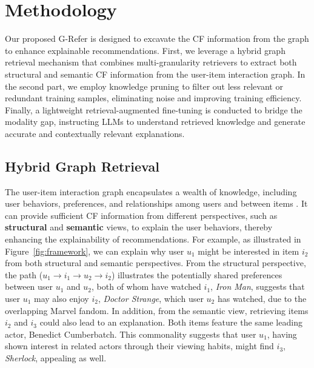 \section{Methodology}

Our proposed G-Refer is designed to excavate the CF information from the graph to enhance explainable recommendations. 
First, we leverage a hybrid graph retrieval mechanism that combines multi-granularity retrievers to extract both structural and semantic CF information from the user-item interaction graph. In the second part, we employ knowledge pruning to filter out less relevant or redundant training samples, eliminating noise and improving training efficiency. Finally, a lightweight retrieval-augmented fine-tuning is conducted to bridge the modality gap, instructing LLMs to understand retrieved knowledge and generate accurate and contextually relevant explanations.

\subsection{Hybrid Graph Retrieval}


The user-item interaction graph encapsulates a wealth of knowledge, including user behaviors, preferences, and relationships among users and between items \cite{wu2024survey}. It can provide sufficient CF information from different perspectives, such as \textbf{structural} and \textbf{semantic} views, to explain the user behaviors, thereby enhancing the explainability of recommendations. 
For example, as illustrated in Figure~\ref{fig:framework}, we can explain why user $u_1$ might be interested in item $i_2$ from both structural and semantic perspectives. 
From the structural perspective, the path ($u_1 \rightarrow i_1 \rightarrow u_2 \rightarrow i_2$) illustrates the potentially shared preferences between user $u_1$ and $u_2$, both of whom have watched $i_1$, \textit{Iron Man}, suggests that user $u_1$ may also enjoy  $i_2$, \textit{Doctor Strange},  which user $u_2$ has watched, due to the overlapping Marvel fandom.
In addition, from the semantic view, retrieving items $i_2$ and $i_3$ could also lead to an explanation. Both items feature the same leading actor, Benedict Cumberbatch. This commonality suggests that user $u_1$, having shown interest in related actors through their viewing habits, might find $i_3$, \textit{Sherlock}, appealing as well.



